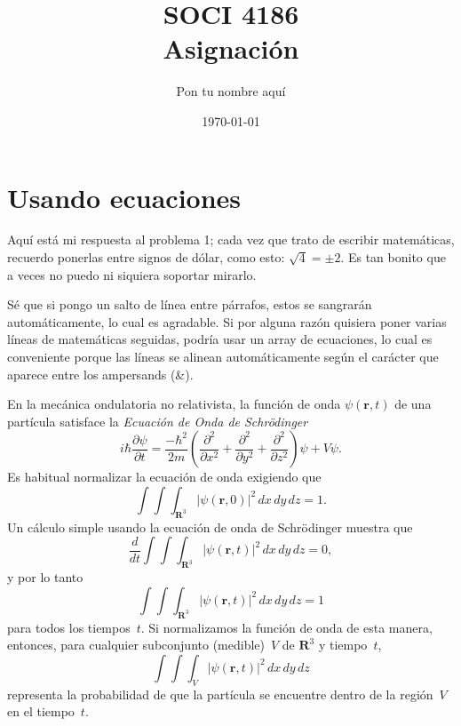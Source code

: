\documentclass[11pt]{article} %
\title{SOCI 4186\\ Asignación \textnumero 1}
\author{Pon tu nombre aquí}
\date{\today}
\begin{document}
\maketitle

\section*{Usando ecuaciones}

Aquí está mi respuesta al problema 1; cada vez que trato de escribir matemáticas, recuerdo ponerlas entre signos de dólar, como esto: $\sqrt{4} = \pm 2$. Es tan bonito que a veces no puedo ni siquiera soportar mirarlo.

Sé que si pongo un salto de línea entre párrafos, estos se sangrarán automáticamente, lo cual es agradable. Si por alguna razón quisiera poner varias líneas de matemáticas seguidas, podría usar un array de ecuaciones, lo cual es conveniente porque las líneas se alinean automáticamente según el carácter que aparece entre los ampersands (\&).

En la mecánica ondulatoria no relativista, la función de onda
$\psi(\mathbf{r},t)$ de una partícula satisface la
\emph{Ecuación de Onda de Schr\"{o}dinger}
\[ i\hbar\frac{\partial \psi}{\partial t}
  = \frac{-\hbar^2}{2m} \left(
    \frac{\partial^2}{\partial x^2}
    + \frac{\partial^2}{\partial y^2}
    + \frac{\partial^2}{\partial z^2}
  \right) \psi + V \psi.\] 
Es habitual normalizar la ecuación de onda exigiendo que
\[ \int \!\!\! \int \!\!\! \int_{\textbf{R}^3}
      \left| \psi(\mathbf{r},0) \right|^2\,dx\,dy\,dz = 1.\] 
Un cálculo simple usando la ecuación de onda de Schr\"{o}dinger muestra que
\[ \frac{d}{dt} \int \!\!\! \int \!\!\! \int_{\textbf{R}^3}
      \left| \psi(\mathbf{r},t) \right|^2\,dx\,dy\,dz = 0,\] 
y por lo tanto
\[ \int \!\!\! \int \!\!\! \int_{\textbf{R}^3}
      \left| \psi(\mathbf{r},t) \right|^2\,dx\,dy\,dz = 1\] 
para todos los tiempos~$t$. Si normalizamos la función de onda de esta
manera, entonces, para cualquier subconjunto (medible)~$V$ de $\textbf{R}^3$
y tiempo~$t$,
\[ \int \!\!\! \int \!\!\! \int_V
      \left| \psi(\mathbf{r},t) \right|^2\,dx\,dy\,dz\] 
representa la probabilidad de que la partícula se encuentre
dentro de la región~$V$ en el tiempo~$t$.
\end{document}
